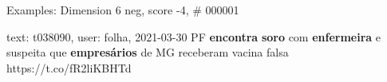 \begin{frame}{Examples: Dimension 6 neg, score -4, \# 000001}
\footnotesize
\begin{alertblock}{text: t038090, user: folha, 2021-03-30}
PF \textbf{encontra} \textbf{soro} com \textbf{enfermeira} e suspeita que 
\textbf{empresários} de MG receberam vacina falsa https://t.co/fR2liKBHTd 
\end{alertblock}
\end{frame}
